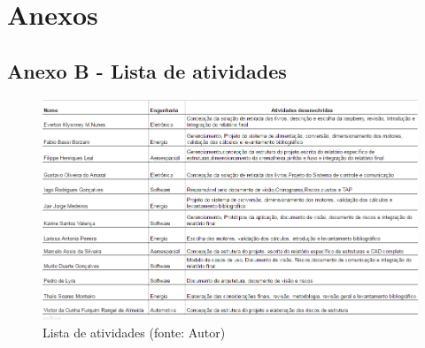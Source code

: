 \chapter[Anexos]{Anexos}
\section{Anexo B - Lista de atividades}

\begin{figure}[!h]
\centering
\includegraphics[scale=0.65, angle = 360]{figuras/lista_atividades}
\caption[]{Lista de atividades (fonte: Autor)}
\end{figure}
\FloatBarrier


